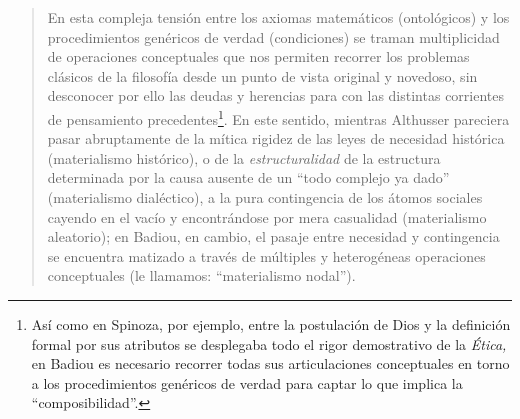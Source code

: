 \begin{quote}
En esta compleja tensión entre los axiomas matemáticos (ontológicos) y los procedimientos genéricos de verdad (condiciones) se traman multiplicidad de operaciones conceptuales que nos permiten recorrer los problemas clásicos de la filosofía desde un punto de vista original y novedoso, sin desconocer por ello las deudas y herencias para con las distintas corrientes de pensamiento precedentes\footnote{Así como en Spinoza, por ejemplo, entre la postulación de Dios y la definición formal por sus atributos se desplegaba todo el rigor demostrativo de la \emph{Ética,} en Badiou es necesario recorrer todas sus articulaciones conceptuales en torno a los procedimientos genéricos de verdad para captar lo que implica la \enquote{composibilidad}.}. En este sentido, mientras Althusser pareciera pasar abruptamente de la mítica rigidez de las leyes de necesidad histórica (materialismo histórico), o de la \emph{estructuralidad} de la estructura determinada por la causa ausente de un \enquote{todo complejo ya dado} (materialismo dialéctico), a la pura contingencia de los átomos sociales cayendo en el vacío y encontrándose por mera casualidad (materialismo aleatorio); en Badiou, en cambio, el pasaje entre necesidad y contingencia se encuentra matizado a través de múltiples y heterogéneas operaciones conceptuales (le llamamos: \enquote{materialismo nodal}).


\end{quote}
